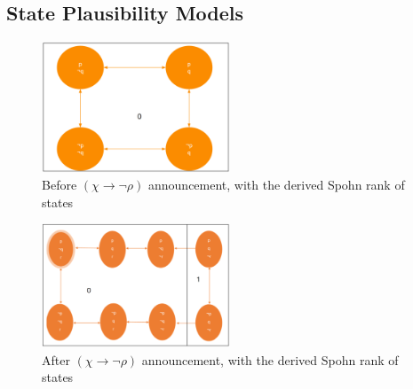 \documentclass[12pt, titlepage, twoside, a4paper]{report}
\begin{document}
\subsection{State Plausibility Models}
\quad
\newline
\begin{figure}[h!]
  \centering
  \includegraphics[width=0.5\textwidth]{slide25.eps}
  \caption{Before $(\chi \to \neg \rho)$ announcement, with the derived Spohn rank of states}
\end{figure}
\begin{figure}[h!]
  \centering
  \includegraphics[width=0.5\textwidth]{slide27.eps}
  \caption{After $(\chi \to \neg \rho)$ announcement, with the derived Spohn rank of states}
\end{figure}
\quad
\newline
\end{document}
